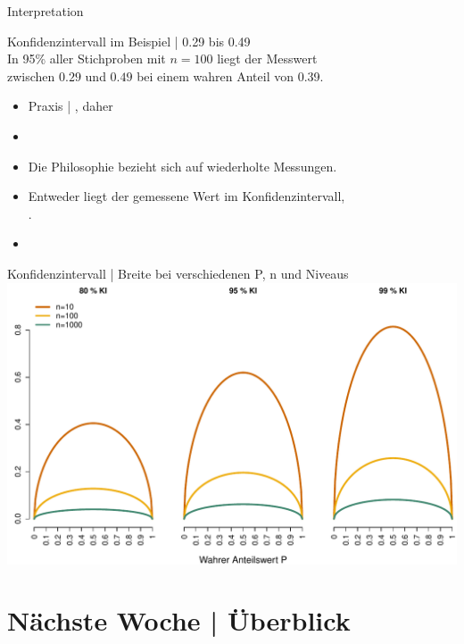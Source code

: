 \begin{frame}
  {Interpretation}
  \begin{center}
    Konfidenzintervall im Beispiel | \alert{0.29 bis 0.49}\\
    \Halbzeile
    In 95\% aller Stichproben mit $n=100$ liegt der Messwert\\
    zwischen $0.29$ und $0.49$ bei einem wahren Anteil von 0.39.
  \end{center}
  \Zeile
  \begin{itemize}[<+->]
    \item Praxis | , daher 
    \Zeile
    \item {}
    \item Die Philosophie bezieht sich auf \alert{wiederholte Messungen}.
      \Halbzeile
    \item Entweder liegt der gemessene Wert im Konfidenzintervall,\\
      .
      \Halbzeile
    \item {}
  \end{itemize}
\end{frame}

\begin{frame}
  {Konfidenzintervall | Breite bei verschiedenen P, n und Niveaus}
  \centering 
  \includegraphics[height=0.85\textheight]{RVorlesung/threecis}
\end{frame}

\ifdefined\TITLE
  \section{Nächste Woche | Überblick}

